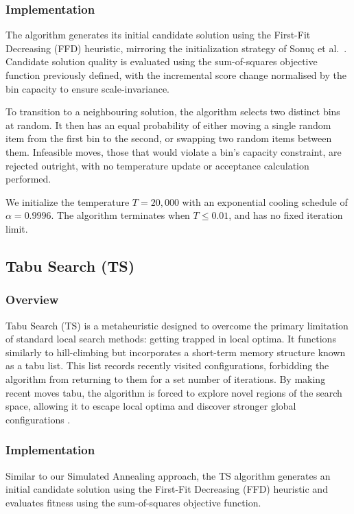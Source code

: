 \documentclass[11pt]{article}
\begin{document}
\subsubsection{Implementation}
The algorithm generates its initial candidate solution using the First-Fit 
Decreasing (FFD) heuristic, mirroring the initialization strategy of Sonuç 
et al.\ \cite{sonuc}. Candidate solution quality is evaluated using the 
sum-of-squares objective function previously defined, with the incremental 
score change normalised by the bin capacity to ensure scale-invariance.

To transition to a neighbouring solution, the algorithm selects two distinct 
bins at random. It then has an equal probability of either moving a single 
random item from the first bin to the second, or swapping two random items 
between them. Infeasible moves, those that would violate a bin's capacity 
constraint, are rejected outright, with no temperature update or acceptance 
calculation performed.

We initialize the temperature $T = 20{,}000$ with an exponential cooling 
schedule of $\alpha = 0.9996$. The algorithm terminates when $T \leq 0.01$, and has no fixed iteration limit.

\subsection{Tabu Search (TS)}

\subsubsection{Overview}
Tabu Search (TS) is a metaheuristic designed to overcome the primary limitation of standard local search methods: getting trapped in local optima. It functions similarly to hill-climbing but incorporates a short-term memory structure known as a tabu list. This list records recently visited configurations, forbidding the algorithm from returning to them for a set number of iterations. By making recent moves tabu, the algorithm is forced to explore novel regions of the search space, allowing it to escape local optima and discover stronger global configurations \cite{sean, gendreau}.

\subsubsection{Implementation}
Similar to our Simulated Annealing approach, the TS algorithm generates an 
initial candidate solution using the First-Fit Decreasing (FFD) heuristic 
and evaluates fitness using the sum-of-squares objective function.
\end{document}
